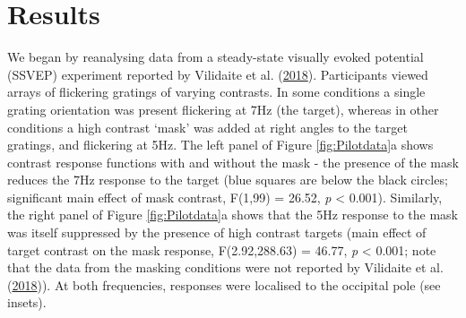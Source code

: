 \documentclass[
]{article}
\begin{document}
\hypertarget{results}{%
\section{Results}\label{results}}

We began by reanalysing data from a steady-state visually evoked potential (SSVEP) experiment reported by Vilidaite et al. (\protect\hyperlink{ref-Vilidaite2018}{2018}). Participants viewed arrays of flickering gratings of varying contrasts. In some conditions a single grating orientation was present flickering at 7Hz (the target), whereas in other conditions a high contrast `mask' was added at right angles to the target gratings, and flickering at 5Hz. The left panel of Figure \ref{fig:Pilotdata}a shows contrast response functions with and without the mask - the presence of the mask reduces the 7Hz response to the target (blue squares are below the black circles; significant main effect of mask contrast, F(1,99) = 26.52, \emph{p} \textless{} 0.001). Similarly, the right panel of Figure \ref{fig:Pilotdata}a shows that the 5Hz response to the mask was itself suppressed by the presence of high contrast targets (main effect of target contrast on the mask response, F(2.92,288.63) = 46.77, \emph{p} \textless{} 0.001; note that the data from the masking conditions were not reported by Vilidaite et al. (\protect\hyperlink{ref-Vilidaite2018}{2018})). At both frequencies, responses were localised to the occipital pole (see insets).
\end{document}
